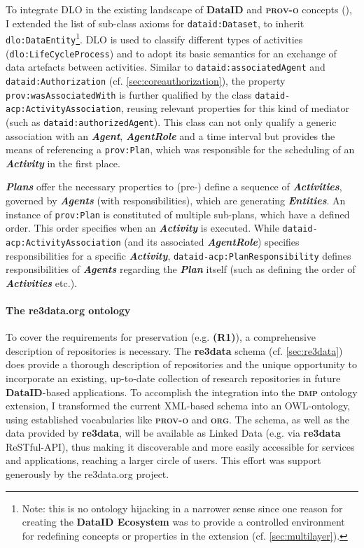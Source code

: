 \documentclass[a4paper,english,twoside,BCOR1.5cm,headsepline,DIV12,appendixprefix,final,12pt]{scrbook}
\newcommand{\ecosystem}{{\ttfamily\bfseries DataID Ecosystem}\xspace}
\newcommand{\dataid}{{\ttfamily\bfseries DataID}\xspace}
\newcommand{\org}{{\scshape\bfseries org}\xspace}
\newcommand{\prov}{{\scshape\bfseries prov-o}\xspace}
\newcommand{\dmp}{{\scshape\bfseries dmp}\xspace}
\newcommand{\redata}{{\ttfamily\bfseries re3data}\xspace}
\newcommand{\prop}[1]{{{\texttt{#1}}}}
\newcommand{\important}[1]{\textbf{\textit{#1}}}
\begin{document}
To integrate DLO in the existing landscape of \dataid and \prov concepts (), I extended the list of sub-class axioms for \prop{dataid:Dataset}, to inherit \prop{dlo:DataEntity}\footnote{Note: this is no ontology hijacking in a narrower sense since one reason for creating the \ecosystem was to provide a controlled environment for redefining concepts or properties in the extension (cf. \cref{sec:multilayer}).}.
DLO is used to classify different types of activities (\prop{dlo:LifeCycleProcess}) and to adopt its basic semantics for an exchange of data artefacts between activities. Similar to \prop{dataid:associatedAgent} and \prop{dataid:Authorization} (cf. \cref{sec:coreauthorization}), the property \prop{prov:wasAssociatedWith} is further qualified by the class \prop{dataid-acp:ActivityAssociation}, reusing relevant properties for this kind of mediator (such as \prop{dataid:authorizedAgent}). This class can not only qualify a generic association with an \important{Agent}, \important{AgentRole} and a time interval but provides the means of referencing a \prop{prov:Plan}, which was responsible for the scheduling of an \important{Activity} in the first place.

\important{Plans} offer the necessary properties to (pre-) define a sequence of \important{Activities}, governed by \important{Agents} (with responsibilities), which are generating \important{Entities}. An instance of \prop{prov:Plan} is constituted of multiple sub-plans, which have a defined order. This order specifies when an \important{Activity} is executed. While \prop{dataid-acp:ActivityAssociation} (and its associated \important{AgentRole}) specifies responsibilities for a specific \important{Activity}, \prop{dataid-acp:PlanResponsibility} defines responsibilities of \important{Agents} regarding the \important{Plan} itself (such as defining the order of \important{Activities} etc.).

\paragraph{The re3data.org ontology} To cover the requirements for preservation (e.g. \textbf{(R1)}), a comprehensive description of repositories is necessary. The \redata schema \cite{r3dSchema} (cf. \cref{sec:re3data}) does provide a thorough description of repositories and the unique opportunity to incorporate an existing, up-to-date collection of research repositories in future \dataid{}-based applications. To accomplish the integration into the \dmp ontology extension, I transformed the current XML-based schema into an OWL-ontology, using established vocabularies like \prov and \org. The schema, as well as the data provided by \redata, will be available as Linked Data (e.g. via \redata ReSTful-API), thus making it discoverable and more easily accessible for services and applications, reaching a larger circle of users. This effort was support generously by the re3data.org project.
\end{document}

